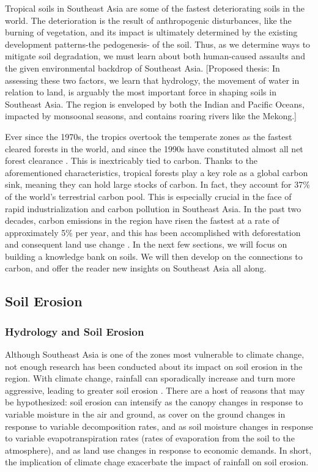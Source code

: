 Tropical soils in Southeast Asia are some of the fastest deteriorating soils in the world. The deterioration is the result of anthropogenic disturbances, like the burning of vegetation, and its impact is ultimately determined by the existing development patterns-the pedogenesis- of the soil. Thus, as we determine ways to mitigate soil degradation, we must learn about both human-caused assaults and the given environmental backdrop of Southeast Asia. [Proposed thesis: In assessing these two factors, we learn that hydrology, the movement of water in relation to land, is arguably the most important force in shaping soils in Southeast Asia. The region is enveloped by both the Indian and Pacific Oceans, impacted by monsoonal seasons, and contains roaring rivers like the Mekong.] 

Ever since the 1970s, the tropics overtook the temperate zones as the fastest cleared forests in the world, and since the 1990s have constituted almost all net forest clearance \citep{houghton1996land}. This is inextricably tied to carbon. Thanks to the aforementioned characteristics, tropical forests play a key role as a global carbon sink, meaning they can hold large stocks of carbon. In fact, they account for 37\% of the world's terrestrial carbon pool. This is especially crucial in the face of rapid industrialization and carbon pollution in Southeast Asia. In the past two decades, carbon emissions in the region have risen the fastest at a rate of approximately 5\% per year, and this has been accomplished with deforestation and consequent land use change \citep{dixon1994carbon}. In the next few sections, we will focus on building a knowledge bank on soils. We will then develop on the connections to carbon, and offer the reader new insights on Southeast Asia all along.




\subsection{Soil Erosion}

\subsubsection{Hydrology and Soil Erosion}

Although Southeast Asia is one of the zones most vulnerable to climate change, not enough research has been conducted about its impact on soil erosion in the region. With climate change, rainfall can sporadically increase and turn more aggressive, leading to greater soil erosion \citep{chappell2007runoff}. There are a host of reasons that may be hypothesized: soil erosion can intensify as the canopy changes in response to variable moisture in the air and ground, as cover on the ground changes in response to variable decomposition rates, and as soil moisture changes in response to variable evapotranspiration rates (rates of evaporation from the soil to the atmosphere), and as land use changes in response to economic demands. In short, the implication of climate chage exacerbate the impact of rainfall on soil erosion. 

